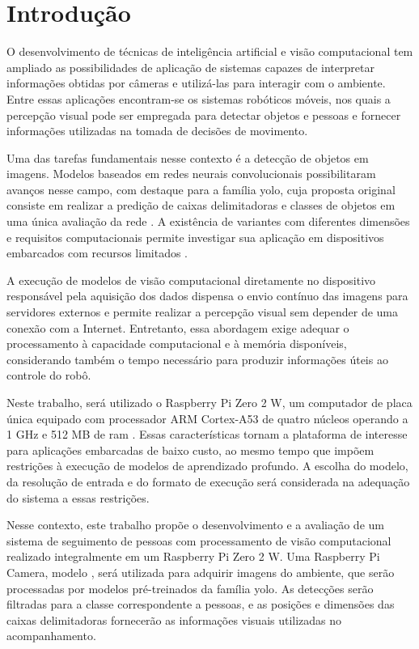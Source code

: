 \chapter{Introdução}
\label{cap:intro}

O desenvolvimento de técnicas de inteligência artificial e visão computacional tem ampliado as possibilidades de aplicação de sistemas capazes de interpretar informações obtidas por câmeras e utilizá-las para interagir com o ambiente. Entre essas aplicações encontram-se os sistemas robóticos móveis, nos quais a percepção visual pode ser empregada para detectar objetos e pessoas e fornecer informações utilizadas na tomada de decisões de movimento.

Uma das tarefas fundamentais nesse contexto é a detecção de objetos em imagens. Modelos baseados em redes neurais convolucionais possibilitaram avanços nesse campo, com destaque para a família \gls{yolo}, cuja proposta original consiste em realizar a predição de caixas delimitadoras e classes de objetos em uma única avaliação da rede \cite{yolo-original}. A existência de variantes com diferentes dimensões e requisitos computacionais permite investigar sua aplicação em dispositivos embarcados com recursos limitados \cite{ultralytics-yolo26}.

A execução de modelos de visão computacional diretamente no dispositivo responsável pela aquisição dos dados dispensa o envio contínuo das imagens para servidores externos e permite realizar a percepção visual sem depender de uma conexão com a Internet. Entretanto, essa abordagem exige adequar o processamento à capacidade computacional e à memória disponíveis, considerando também o tempo necessário para produzir informações úteis ao controle do robô.

Neste trabalho, será utilizado o Raspberry Pi Zero 2 W, um computador de placa única equipado com processador ARM Cortex-A53 de quatro núcleos operando a 1 GHz e 512 MB de \gls{ram} \cite{raspberry}. Essas características tornam a plataforma de interesse para aplicações embarcadas de baixo custo, ao mesmo tempo que impõem restrições à execução de modelos de aprendizado profundo. A escolha do modelo, da resolução de entrada e do formato de execução será considerada na adequação do sistema a essas restrições.

Nesse contexto, este trabalho propõe o desenvolvimento e a avaliação de um sistema de seguimento de pessoas com processamento de visão computacional realizado integralmente em um Raspberry Pi Zero 2 W. Uma Raspberry Pi Camera, modelo , será utilizada para adquirir imagens do ambiente, que serão processadas por modelos pré-treinados da família \gls{yolo}. As detecções serão filtradas para a classe correspondente a pessoas, e as posições e dimensões das caixas delimitadoras fornecerão as informações visuais utilizadas no acompanhamento.

